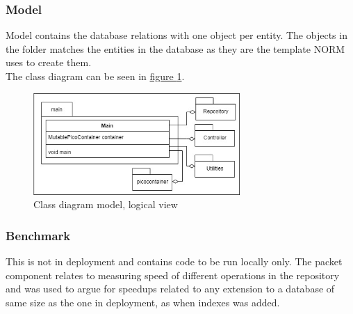 \subsubsection{Model}
Model contains the database relations with one object per entity. The objects in the folder matches the entities in the database as they are the template NORM uses to create them.\\
The class diagram can be seen in \hyperref[fig:classDiagramModel]{figure \ref{fig:classDiagramModel}}.
\begin{figure}[H]
    \centering
    \includegraphics[width=0.7\textwidth]{images/class_diagram_model.jpg}
    \caption{Class diagram model, logical view}
    \label{fig:classDiagramModel}
\end{figure}

\subsubsection{Benchmark}
This is not in deployment and contains code to be run locally only. The packet component relates to measuring speed of different operations in the repository and was used to argue for speedups related to any extension to a database of same size as the one in deployment, as when indexes was added.


